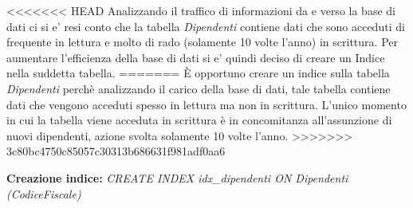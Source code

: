 <<<<<<< HEAD
Analizzando il traffico di informazioni da e verso la base di dati ci si e' resi conto che la tabella \emph{Dipendenti} contiene dati che sono acceduti di frequente in lettura e molto di rado (solamente 10 volte l'anno) in scrittura. Per aumentare l'efficienza della base di dati si e' quindi deciso di creare un Indice nella suddetta tabella.
=======
È opportuno creare un indice sulla tabella \emph{Dipendenti} perchè analizzando il carico della base di dati, tale tabella contiene dati che vengono acceduti spesso in lettura ma non in scrittura. L'unico momento in cui la tabella viene acceduta in scrittura è in concomitanza all'assunzione di nuovi dipendenti, azione svolta solamente 10 volte l'anno.
>>>>>>> 3c80bc4750c85057c30313b686631f981adf0aa6
\begin{flushleft}
	\textbf{{Creazione indice:}} \emph{CREATE INDEX idx\_dipendenti ON Dipendenti (CodiceFiscale)}
\end{flushleft}

